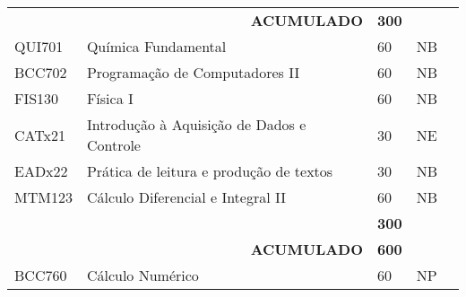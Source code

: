 \begin{table}[]
{\begin{tabular}{l|l|l|l|l}
			\multicolumn{1}{|l|}{}                              & \multicolumn{1}{r|}{\textbf{ACUMULADO}}                  & \textbf{300}                                                 & \textbf{}               &  \\ \cline{1-4}
			\multicolumn{1}{|l|}{QUI701}                        & Química Fundamental                                      & 60                                                           & NB                      &  \\ \cline{1-4}
			\multicolumn{1}{|l|}{BCC702}                        & Programação de Computadores II                           & 60                                                           & NB                      &  \\ \cline{1-4}
			\multicolumn{1}{|l|}{FIS130}                        & Física I                                                 & 60                                                           & NB                      &  \\ \cline{1-4}
			\multicolumn{1}{|l|}{CATx21}                        & Introdução à Aquisição de Dados e Controle               & 30                                                           & NE                      &  \\ \cline{1-4}
			\multicolumn{1}{|l|}{EADx22}                        & Prática de leitura e produção de textos                  & 30                                                           & NB                      &  \\ \cline{1-4}
			\multicolumn{1}{|l|}{MTM123}                        & Cálculo Diferencial e Integral II                        & 60                                                           & NB                      &  \\ \cline{1-4}
			\multicolumn{1}{|l|}{}                              &                                                          & \textbf{300}                                                 &                         &  \\ \cline{1-4}
			\multicolumn{1}{|l|}{}                              & \multicolumn{1}{r|}{\textbf{ACUMULADO}}                  & \textbf{600}                                                 &                         &  \\ \cline{1-4}
			\multicolumn{1}{|l|}{BCC760}                        & Cálculo Numérico                                         & 60                                                           & NP                      &  \\ \cline{1-4}

\end{tabular}}
\end{table}
